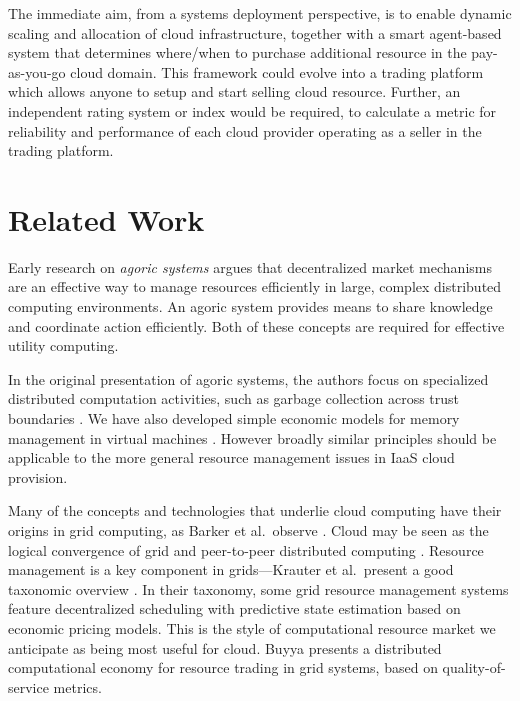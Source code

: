 \documentclass[conference,10pt]{IEEEtran}
\begin{document}
The immediate aim, from a systems deployment perspective, is to enable
dynamic scaling and allocation of cloud infrastructure, together with a smart agent-based system that determines where/when to purchase  additional resource 
in the pay-as-you-go cloud domain. 
This framework could evolve into 
a trading platform which allows anyone to setup and start selling cloud resource. Further, an independent rating system or index would be required, to calculate a metric for reliability and performance of each cloud provider operating as a seller in the trading platform.


\section{Related Work}
\label{sec-relw}

Early research on \emph{agoric systems}  \cite{miller88markets} argues that decentralized market mechanisms are an effective way to manage resources efficiently in large, complex distributed computing environments. An agoric system provides means to share knowledge and coordinate action efficiently. Both of these concepts are required for effective utility computing.

In the original presentation of agoric systems, the authors focus on specialized distributed computation activities, such as garbage collection across trust boundaries \cite{miller88incentive}. We have also developed simple economic models for memory management in virtual machines \cite{singer10economics,cameron15judgment}.  However broadly similar principles should be applicable to the more general resource management issues in IaaS cloud provision.


Many of the concepts and technologies that underlie cloud computing have their origins in grid computing, as Barker et al.\ observe \cite{barker14academic}.
Cloud may be seen as the logical convergence of grid and peer-to-peer distributed computing \cite{foster03death}.
Resource management is a key component in grids---Krauter et al.\ present a good taxonomic overview \cite{krauter02taxonomy}. In their taxonomy, some grid resource management systems feature decentralized scheduling with predictive state estimation based on economic pricing models. This is the style of computational resource market we anticipate as being most useful for cloud.
Buyya \cite{buyya02economic} presents a distributed computational economy for resource trading in grid systems, based on quality-of-service metrics.
\end{document}
